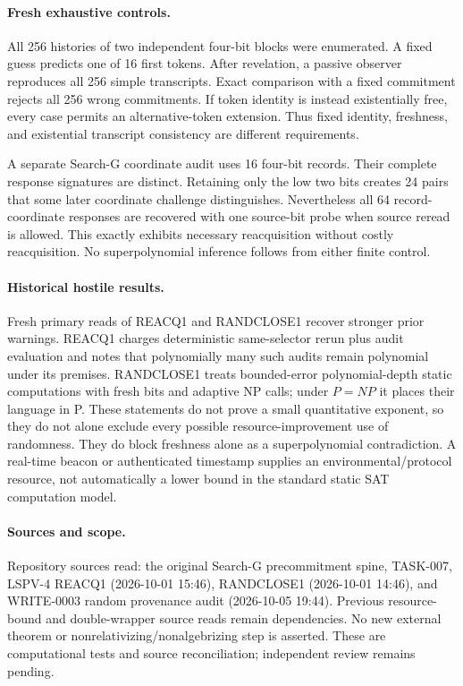 \documentclass[11pt]{article}
\begin{document}
\paragraph{Fresh exhaustive controls.}
All 256 histories of two independent four-bit blocks were enumerated. A fixed
guess predicts one of 16 first tokens. After revelation, a passive observer
reproduces all 256 simple transcripts. Exact comparison with a fixed commitment
rejects all 256 wrong commitments. If token identity is instead existentially
free, every case permits an alternative-token extension. Thus fixed identity,
freshness, and existential transcript consistency are different requirements.

A separate Search-G coordinate audit uses 16 four-bit records. Their complete
response signatures are distinct. Retaining only the low two bits creates 24
pairs that some later coordinate challenge distinguishes. Nevertheless all 64
record-coordinate responses are recovered with one source-bit probe when source
reread is allowed. This exactly exhibits necessary reacquisition without costly
reacquisition. No superpolynomial inference follows from either finite control.

\paragraph{Historical hostile results.}
Fresh primary reads of REACQ1 and RANDCLOSE1 recover stronger prior warnings.
REACQ1 charges deterministic same-selector rerun plus audit evaluation and notes
that polynomially many such audits remain polynomial under its premises.
RANDCLOSE1 treats bounded-error polynomial-depth static computations with fresh
bits and adaptive NP calls; under $P=NP$ it places their language in P.
These statements do not prove a small quantitative exponent, so they do not
alone exclude every possible resource-improvement use of randomness. They do
block freshness alone as a superpolynomial contradiction. A real-time beacon
or authenticated timestamp supplies an environmental/protocol resource, not
automatically a lower bound in the standard static SAT computation model.

\paragraph{Sources and scope.}
Repository sources read: the original Search-G precommitment spine, TASK-007,
LSPV-4 REACQ1 (2026-10-01 15:46), RANDCLOSE1 (2026-10-01 14:46), and
WRITE-0003 random provenance audit (2026-10-05 19:44). Previous resource-bound
and double-wrapper source reads remain dependencies. No new external theorem
or nonrelativizing/nonalgebrizing step is asserted. These are computational
tests and source reconciliation; independent review remains pending.
\end{document}
